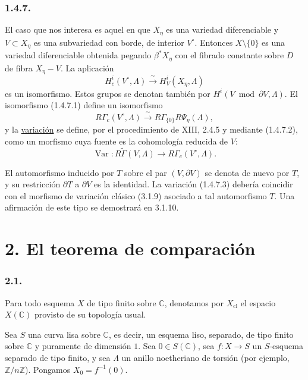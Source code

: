 \pageoriginale

\subsubsection*{1.4.7.}
El caso que nos interesa es aquel en que $X_\eta$ es una variedad
diferenciable y $V\subset X_\eta$ es una subvariedad con borde, de interior
$V^\circ$. Entonces $X\setminus\{0\}$ es una variedad diferenciable obtenida
pegando $\beta^*X_\eta$ con el fibrado constante sobre $D$ de fibra
$X_\eta-V$. La aplicación
\begin{equation}\tag{1.4.7.1}
H_c^i(V^\circ,\Lambda)
\xrightarrow{\ \sim\ }H_V^i(X_\eta,\Lambda)
\end{equation}
es un isomorfismo. Estos grupos se denotan también por
$H^i(V\bmod\partial V,\Lambda)$. El isomorfismo (1.4.7.1) define un
isomorfismo
\begin{equation}\tag{1.4.7.2}
R\Gamma_c(V^\circ,\Lambda)
\xrightarrow{\ \sim\ }
R\Gamma_{\{0\}}R\Psi_\eta(\Lambda),
\end{equation}
y la \underline{variación} se define, por el procedimiento de XIII, 2.4.5 y
mediante (1.4.7.2), como un morfismo cuya fuente es la cohomología reducida de
$V$:
\begin{equation}\tag{1.4.7.3}
\operatorname{Var}:
R\widetilde\Gamma(V,\Lambda)
\longrightarrow R\Gamma_c(V^\circ,\Lambda).
\end{equation}

El automorfismo inducido por $T$ sobre el par $(V,\partial V)$ se denota de
nuevo por $T$, y su restricción $\partial T$ a $\partial V$ es la identidad.
La variación (1.4.7.3) debería coincidir con el morfismo de variación clásico
(3.1.9) asociado a tal automorfismo $T$. Una afirmación de este tipo se
demostrará en 3.1.10.

\section*{2. El teorema de comparación}

\subsubsection*{2.1.}
Para todo esquema $X$ de tipo finito sobre $\mathbb C$, denotamos por
$X_{\mathrm{cl}}$ el espacio $X(\mathbb C)$ provisto de su topología usual.

Sea $S$ una curva lisa sobre $\mathbb C$, es decir, un esquema liso, separado,
de tipo finito sobre $\mathbb C$ y puramente de dimensión $1$. Sea
$0\in S(\mathbb C)$, sea $f:X\longrightarrow S$ un $S$-esquema separado de
tipo finito, y sea $\Lambda$ un anillo noetheriano de torsión (por ejemplo,
$\mathbb Z/n\mathbb Z$). Pongamos $X_0=f^{-1}(0)$.


